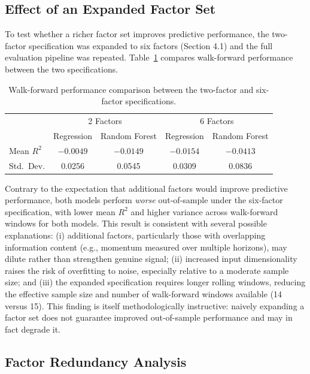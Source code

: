 \documentclass[11pt]{article}
\begin{document}
\subsection{Effect of an Expanded Factor Set}

To test whether a richer factor set improves predictive performance, the two-factor specification was expanded to six factors (Section 4.1) and the full evaluation pipeline was repeated. Table~\ref{tab:factor_comparison} compares walk-forward performance between the two specifications.

\begin{table}[h]
\centering
\begin{tabular}{lcccc}
\toprule
& \multicolumn{2}{c}{2 Factors} & \multicolumn{2}{c}{6 Factors} \\
& Regression & Random Forest & Regression & Random Forest \\
\midrule
Mean $R^2$ & $-0.0049$ & $-0.0149$ & $-0.0154$ & $-0.0413$ \\
Std.\ Dev. & 0.0256 & 0.0545 & 0.0309 & 0.0836 \\
\bottomrule
\end{tabular}
\caption{Walk-forward performance comparison between the two-factor and six-factor specifications.}
\label{tab:factor_comparison}
\end{table}

Contrary to the expectation that additional factors would improve predictive performance, both models perform \emph{worse} out-of-sample under the six-factor specification, with lower mean $R^2$ and higher variance across walk-forward windows for both models. This result is consistent with several possible explanations: (i) additional factors, particularly those with overlapping information content (e.g., momentum measured over multiple horizons), may dilute rather than strengthen genuine signal; (ii) increased input dimensionality raises the risk of overfitting to noise, especially relative to a moderate sample size; and (iii) the expanded specification requires longer rolling windows, reducing the effective sample size and number of walk-forward windows available (14 versus 15). This finding is itself methodologically instructive: naively expanding a factor set does not guarantee improved out-of-sample performance and may in fact degrade it.

\subsection{Factor Redundancy Analysis}
\end{document}
